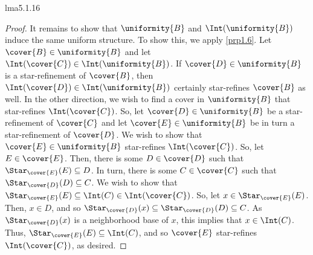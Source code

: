 \begin{prp}{}{lma5.1.16}
\begin{proof}
It remains to show that $\uniformity{B}$ and $\Int (\uniformity{B})$ induce the same uniform structure.  To show this, we apply \cref{prp1.6}.  Let $\cover{B}\in \uniformity{B}$ and let $\Int (\cover{C})\in \Int (\uniformity{B})$.  If $\cover{D}\in \uniformity{B}$ is a star-refinement of $\cover{B}$, then $\Int (\cover{D})\in \Int (\uniformity{B})$ certainly star-refines $\cover{B}$ as well.  In the other direction, we wish to find a cover in $\uniformity{B}$ that star-refines $\Int (\cover{C})$.  So, let $\cover{D}\in \uniformity{B}$ be a star-refinement of $\cover{C}$ and let $\cover{E}\in \uniformity{B}$ be in turn a star-refinement of $\cover{D}$.  We wish to show that $\cover{E}\in \uniformity{B}$ star-refines $\Int (\cover{C})$.  So, let $E\in \cover{E}$.  Then, there is some $D\in \cover{D}$ such that $\Star _{\cover{E}}(E)\subseteq D$.  In turn, there is some $C\in \cover{C}$ such that $\Star _{\cover{D}}(D)\subseteq C$.  We wish to show that $\Star _{\cover{E}}(E)\subseteq \Int (C)\in \Int (\cover{C})$.  So, let $x\in \Star _{\cover{E}}(E)$.  Then, $x\in D$, and so $\Star _{\cover{D}}(x)\subseteq \Star _{\cover{D}}(D)\subseteq C$.  As $\Star _{\cover{D}}(x)$ is a neighborhood base of $x$, this implies that $x\in \Int (C)$.  Thus, $\Star _{\cover{E}}(E)\subseteq \Int (C)$, and so $\cover{E}$ star-refines $\Int (\cover{C})$, as desired.
\end{proof}
\end{prp}

